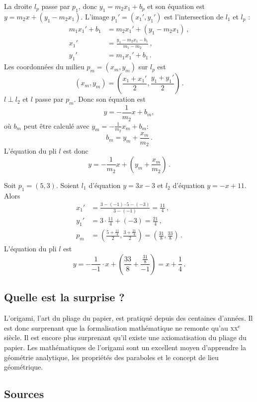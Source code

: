 La droite $l_p$ passe par $p_1$, donc $y_1=m_2x_1+b_p$ et son équation est $y=m_2x+(y_1-m_2x_1)$. L'image $p_1'=(x_1',y_1')$ est l'intersection de $l_1$ et $l_p$ :
\begin{align*}
m_1x_1'+b_1&=m_2x_1'+(y_1-m_2x_1)\,,\\
x_1'&=\frac{y_1-m_2x_1-b_1}{m_1-m_2}\,,\\
y_1'&=m_1x_1'+b_1\,.
\end{align*}
Les coordonnées du milieu $p_m=(x_m,y_m)$ sur $l_p$ est 
\[
(x_m,y_m)=\left(\frac{x_1+x_1'}{2},\frac{y_1+y_1'}{2}\right)\,.
\]
$l\perp l_2$ et  $l$ passe par $p_m$. Donc son équation est 
\[
y=-\frac{1}{m_2}x+b_m,
\]
où $b_m$ peut être calculé avec   $y_m=-\displaystyle\frac{1}{m_2}x_m+b_m$:
\[b_m=y_m+\frac{x_m}{m_2}\,.\]
L'équation du pli $l$ est donc 
\[
y=-\frac{1}{m_2}x+\left(y_m+\displaystyle\frac{x_m}{m_2}\right)\,.
\]
\begin{example}
Soit $p_1=(5,3)$. Soient  $l_1$ d'équation $y=3x-3$ et  $l_2$ d'équation $y=-x+11$. Alors 
\begin{align*}
x_1'&=\frac{3-(-1)\cdot 5-(-3)}{3-(-1)}=\frac{11}{4}\,,\\
y_1'&=3\cdot \frac{11}{4} + (-3)=\frac{21}{4}\,,\\
p_m&=\left(\frac{5+\displaystyle\frac{11}{4}}{2},\frac{3+\displaystyle\frac{21}{4}}{2}\right)=\left(\frac{31}{8},\frac{33}{8}\right)\,.
\end{align*}
L'équation du pli $l$ est 
\[
y=-\frac{1}{-1}\cdot x+\left(\frac{33}{8}+\frac{\displaystyle\frac{31}{8}}{-1}\right)=x+\frac{1}{4}\,.
\]
\end{example}

\vspace{-2ex}

\subsection*{Quelle est la surprise ?}

L'origami, l'art du pliage du papier, est pratiqué depuis des centaines d'années. Il est donc surprenant que la formalisation mathématique ne remonte qu'au \textsc{xx}$^\text{e}$ siècle. Il est encore plus surprenant qu'il existe une axiomatisation du pliage du papier. Les mathématiques de l'origami sont un excellent moyen d'apprendre la géométrie analytique, les propriétés des paraboles et le concept de lieu géométrique.

\vspace{-2ex}

\subsection*{Sources}


